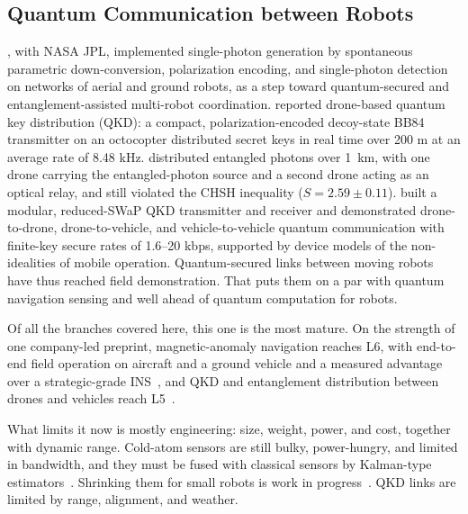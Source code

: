 \documentclass[acmsmall,screen,review]{acmart}
\begin{document}
\subsection{Quantum Communication between Robots}\label{sec:qkd}
\citet{Khoshnoud2020}, with NASA JPL, implemented single-photon generation by spontaneous parametric down-conversion, polarization encoding, and single-photon detection on networks of aerial and ground robots, as a step toward quantum-secured and entanglement-assisted multi-robot coordination. \citet{Tian2023} reported drone-based quantum key distribution (QKD): a compact, polarization-encoded decoy-state BB84 transmitter on an octocopter distributed secret keys in real time over 200 m at an average rate of 8.48 kHz. \citet{Liu2021} distributed entangled photons over 1~km, with one drone carrying the entangled-photon source and a second drone acting as an optical relay, and still violated the CHSH inequality ($S=2.59\pm 0.11$). \citet{Conrad2025} built a modular, reduced-SWaP QKD transmitter and receiver and demonstrated drone-to-drone, drone-to-vehicle, and vehicle-to-vehicle quantum communication with finite-key secure rates of 1.6--20 kbps, supported by device models of the non-idealities of mobile operation. Quantum-secured links between moving robots have thus reached field demonstration. That puts them on a par with quantum navigation sensing and well ahead of quantum computation for robots.

Of all the branches covered here, this one is the most mature. On the strength of one company-led preprint, magnetic-anomaly navigation reaches L6, with end-to-end field operation on aircraft and a ground vehicle and a measured advantage over a strategic-grade INS~\cite{Muradoglu2025}, and QKD and entanglement distribution between drones and vehicles reach L5~\cite{Tian2023,Conrad2025,Liu2021}.

What limits it now is mostly engineering: size, weight, power, and cost, together with dynamic range. Cold-atom sensors are still bulky, power-hungry, and limited in bandwidth, and they must be fused with classical sensors by Kalman-type estimators~\cite{Cheiney2018,Wang2021}. Shrinking them for small robots is work in progress~\cite{Bongs2019}. QKD links are limited by range, alignment, and weather.
\end{document}
